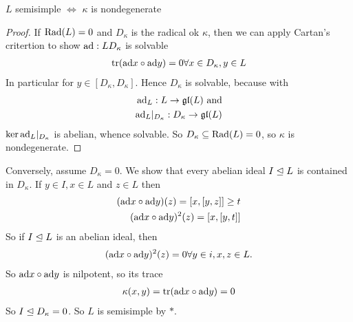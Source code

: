 \begin{theorem}
    $L$ semisimple $\iff$ $\kappa$ is nondegenerate
\end{theorem}
\begin{proof}
    If $\text{Rad}(L) = 0$ and $D_\kappa$ is the radical ok $\kappa$, then we can apply Cartan's critertion to show
    $\text{ad}:L D_\kappa$ is solvable
    \begin{align*}
        \operatorname{tr}(\text{ad} x \circ \text{ad} y) = 0 \forall x \in D_\kappa, y \in L
    \end{align*}
    In particular for $y \in [D_\kappa, D_\kappa]$.
    Hence $D_\kappa$ is solvable, because with
    \begin{align*}
        \text{ad}_L : L \to \mathfrak{gl}(L) \text{ and}\\
        \text{ad}_L |_{D_\kappa}: D_\kappa \to \mathfrak{gl}(L)
    \end{align*}
    $\ker \text{ad}_{L}|_{D_\kappa}$ is abelian, whence solvable.
    So $D_\kappa \subseteq \text{Rad}(L) = 0$, so $\kappa$ is nondegenerate.
\end{proof}

Conversely, assume $D_\kappa = 0$. We show that every abelian ideal $I \trianglelefteq L$ is contained in $D_\kappa$.
If $y \in I, x \in L$ and $z \in L$ then
\begin{align*}
    (\text{ad} x \circ \text{ad} y)(z) = [x,[y,z]] \geq t\\
    (\text{ad} x \circ \text{ad} y)^2(z) = [x,[y,t]]
\end{align*}
So if $I \trianglelefteq L$ is an abelian ideal, then 
\begin{align*}
    (\text{ad} x \circ \text{ad} y)^2 (z) = 0 \forall y \in i, x,z \in L.
\end{align*}
So $\text{ad} x \circ \text{ad} y$ is nilpotent, so its trace
\begin{align*}
    \kappa(x,y) = \operatorname{tr}(\text{ad} x \circ \text{ad} y) = 0
\end{align*}
So $I \trianglelefteq D_\kappa = 0$. So $L$ is semisimple by $\ast$.


